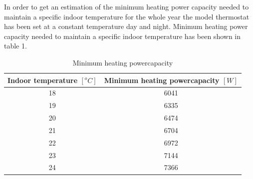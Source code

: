 In order to get an estimation of the minimum heating power capacity needed to maintain a specific indoor temperature for the whole year the model thermostat has been set at a constant temperature day and night.
Minimum heating power capacity needed to maintain a specific indoor temperature has been shown in table 1.

\begin{table}[H]
    \centering
    \begin{tabular}{|c|c|}
    \hline
    Indoor temperature $[^oC]$  & Minimum heating powercapacity $[W]$ \\
    
    \hline
     18     &  6041 \\
     
     \hline
     19     &  6335 \\
     
     \hline
     20     &  6474 \\
     
     \hline
     21     &  6704 \\
     
     \hline
     22     &  6972 \\
     
     \hline
     23     &  7144 \\
     
     \hline
     24     &  7366 \\
     
    \hline

    \end{tabular}
    \caption{Minimum heating powercapacity}
    \label{tab:Minimumheat}
\end{table}
 
\newpage